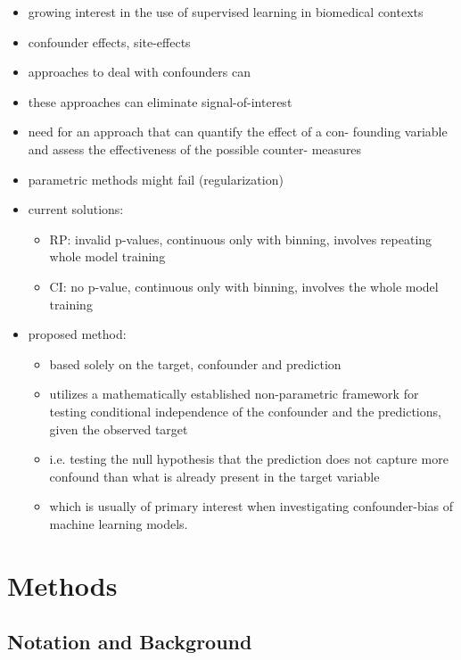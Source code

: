 \documentclass{article}
\theoremstyle{definition}
\begin{document}
\begin{itemize}
    \item growing interest in the use of
supervised learning in biomedical contexts
    \item confounder effects, site-effects
    \item approaches to deal with confounders can
    \item these approaches can eliminate signal-of-interest
    \item need for an approach that can quantify the effect of a con- founding variable and assess the effectiveness of the possible counter- measures
    \item parametric methods might fail (regularization)
    \item current solutions:
    \begin{itemize}
        \item RP: invalid p-values, continuous only with binning, involves repeating whole model training
        \item CI: no p-value, continuous only with binning, involves the whole model training
    \end{itemize}
    \item proposed method:
    \begin{itemize}
        \item based solely on the target, confounder and prediction
        \item utilizes a mathematically established non-parametric framework for testing conditional independence of the confounder and the predictions, given the observed target
        \item i.e. testing the null hypothesis that the prediction does not capture more confound than what is already present in the target variable
        \item which is usually of primary interest when investigating confounder-bias of machine learning models.
    \end{itemize}
\end{itemize}


\section{Methods}

\subsection{Notation and Background}
\end{document}
